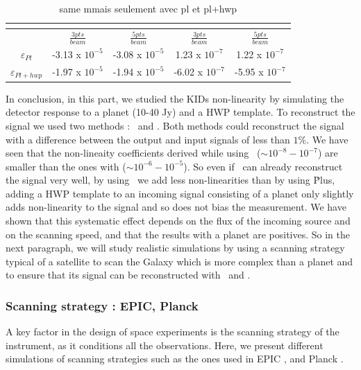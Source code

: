 \begin{table}
\tiny
\begin{tabular}{|c|c|c|c|c|}
	\hline
	    & \multicolumn{2}{|c|}{\rf} & \multicolumn{2}{|c|}{\cf} \\
	\hline
	    & $\frac{3pts}{beam}$ & $\frac{5pts}{beam}$ & $\frac{3pts}{beam}$ & $\frac{5pts}{beam}$ \\
	    \hline
	    $\varepsilon_{Pl}$ & -3.13 x $10^{-5}$ & -3.08 x $10^{-5}$ & 1.23 x $10^{-7}$ & 1.22 x $10^{-7}$ \\ 
	    \hline
	    $\varepsilon_{Pl+hwp}$ & -1.97 x $10^{-5}$ & -1.94 x $10^{-5}$ & -6.02 x $10^{-7}$ & -5.95 x $10^{-7}$ \\
	\hline
\end{tabular}
\caption{same mmais seulement avec pl et pl+hwp}
\label{tab:eps}
\end{table}

In conclusion, in this part, we studied the KIDs non-linearity by simulating the detector response to a planet (10-40 Jy) and a HWP template. To reconstruct the signal we used two methods : \rf\ and \cf . Both methods could reconstruct the signal with a difference between the output and input signals of less than $1 \%$. We have seen that the non-lineaity coefficients derived while using \cf\  ($\sim 10^{-8} - 10^{-7} $)  are smaller than the ones with \rf   ($\sim 10^{-6} - 10^{-5} $). So even if \rf\ can already reconstruct the signal very well, by using \cf\ we add less non-linearities than by using \rf\.  Plus, adding a HWP template to an incoming signal consisting of a planet only slightly adds non-linearity to the signal and so does not bias the measurement. We have shown that this systematic effect depends on the flux of the incoming source and on the scanning speed, and that the results with a planet are positives. So in the next paragraph, we will study realistic simulations by using a scanning strategy typical of a satellite to scan the Galaxy which is more complex than a planet and to ensure that its signal can be reconstructed with \rf\ and \cf .
		
\subsubsection{Scanning strategy : EPIC, Planck}
A key factor in the design of space experiments is the scanning strategy of the instrument, as it conditions all the observations. Here, we present different simulations of scanning strategies such as the ones used in EPIC \citep{2009arXiv0906.1188B}, and Planck \citep{2005A&A...430..363D}. \\

